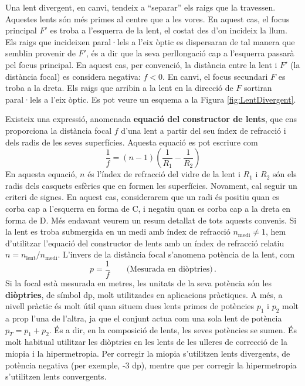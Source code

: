 \documentclass[12pt]{book}
\begin{document}
%
Una lent divergent, en canvi, tendeix a ``separar'' els raigs que la travessen. Aquestes lents són més primes al centre que a les vores. En aquest cas, el focus principal $F'$ es troba a l'esquerra de la lent, el costat des d'on incideix la llum. Els raigs que incideixen paral·lels a l'eix òptic es dispersaran de tal manera que semblin provenir de $F'$, és a dir que la seva perllongació cap a l'esquerra passarà pel focus principal. En aquest cas, per convenció, la distància entre la lent i $F'$ (la distància focal) es considera negativa: $f < 0$. En canvi, el focus secundari $F$ es troba a la dreta. Els raigs que arribin a la lent en la direcció de $F$ sortiran paral·lels a l'eix òptic. Es pot veure un esquema a la Figura \ref{fig:LentDivergent}. 

Existeix una expressió, anomenada {\bf equació del constructor de lents}, que ens proporciona la distància focal $f$ d'una lent a partir del seu índex de refracció i dels radis de les seves superfícies. Aquesta equació es pot escriure com
%
\begin{equation}
    \boxed{\frac{1}{f} = (n - 1) \left(\frac{1}{R_1} - \frac{1}{R_2}\right)}
\end{equation}
%
En aquesta equació, $n$ és l'índex de refracció del vidre de la lent i $R_1$ i $R_2$ són els radis dels casquets esfèrics que en formen les superfícies. Novament, cal seguir un criteri de signes. En aquest cas, considerarem que un radi és positiu quan es corba cap a l'esquerra en forma de C, i negatiu quan es corba cap a la dreta en forma de D. Més endavant veurem un resum detallat de tots aquests convenis. Si la lent es troba submergida en un medi amb índex de refracció $n_\text{medi} \neq 1$, hem d'utilitzar l'equació del constructor de lents amb un índex de refracció relatiu $n = n_\text{lent}/n_\text{medi}$. L'invers de la distància focal s'anomena potència de la lent, com
%
\begin{equation}
    p = \frac{1}{f} \qquad \text{(Mesurada en diòptries)}\, .
\end{equation}
%
Si la focal està mesurada en metres, les unitats de la seva potència són les {\bf diòptries}, de símbol dp, molt utilitzades en aplicacions pràctiques. A més, a nivell pràctic és molt útil quan situem dues lents primes de potències $p_1$ i $p_2$ molt a prop l'una de l'altra, ja que el conjunt actua com una sola lent de potència $p_T = p_1 + p_2$. És a dir, en la composició de lents, les seves potències se sumen. És molt habitual utilitzar les diòptries en les lents de les ulleres de correcció de la miopia i la hipermetropia. Per corregir la miopia s'utilitzen lents divergents, de potència negativa (per exemple, -3 dp), mentre que per corregir la hipermetropia s'utilitzen lents convergents.
\end{document}
